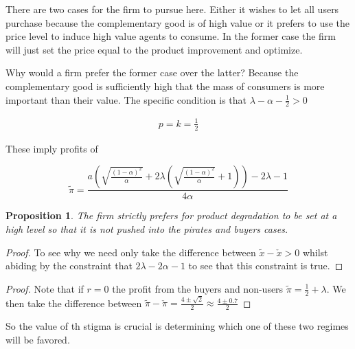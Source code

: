 \documentclass{article}
\newtheorem{proposition}{Proposition}
\begin{document}
There are two cases for the firm to pursue here. Either it wishes to let all users purchase because the complementary good is of high value or it prefers to use the price level to induce high value agents to consume. In the former case the firm will just set the price equal to the product improvement and optimize.

Why would a firm prefer the former case over the latter? Because the complementary good is sufficiently high that the mass of consumers is more important than their value. The specific condition is that $\lambda-\alpha-\frac{1}{2}>0$

\begin{equation}\label{BUB}
\begin{array}{ll}
p = k = \frac{1}{2}
\end{array}
\end{equation}

These imply profits of 

\begin{equation}
\tilde{\pi} =\frac{a(\sqrt{\frac{(1-\alpha)^2}{\alpha}}+2\lambda(\sqrt{\frac{(1-\alpha)^2}{\alpha}}+1))- 2\lambda-1}{4 \alpha} 
\end{equation} 

\begin{proposition}
The firm strictly prefers for product degradation to be set at a high level so that it is not pushed into the pirates and buyers cases.  
\end{proposition}

\begin{proof}
To see why we need only take the difference between $\tilde{x}-\check{x}>0$ whilst abiding by the constraint that $2 \lambda -2\alpha-1$ to see that this constraint is true. 
\end{proof} 

\begin{proof}
Note that if $r =0 $ the profit from the buyers and non-users $\tilde{\pi} = \frac{1}{2} + \lambda$. We then take the difference between $\tilde{\pi}-\check{\pi}=\frac{4 \pm \sqrt{2}}{2} \approx \frac{4 \pm 0.7}{2} $
\end{proof}

So the value of th stigma is crucial is determining which one of these two regimes will be favored. 





\end{document}
